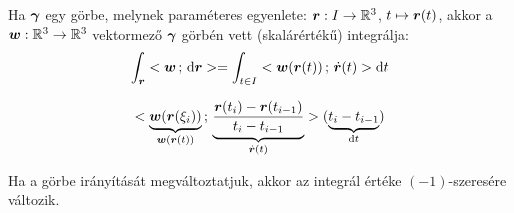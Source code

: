 \documentclass[main.tex]{subfiles}
\begin{document}

Ha $\boldsymbol{\gamma}$ egy görbe, melynek paraméteres egyenlete:
$\boldsymbol{r} : I \rightarrow \mathbb{R}^3$, $t \mapsto \boldsymbol{r}(t)$,
akkor a $\boldsymbol{w}: \mathbb{R}^3 \rightarrow \mathbb{R}^3$ vektormező
$\boldsymbol{\gamma}$ görbén vett (skalárértékű) integrálja:
\begin{equation*}
  \int_{\rvec{r}} \scalar{\rvec{w}}{\differential \rvec{r}}
  = \int_{t \in I} \scalar{
    \rvec{w}(\rvec{r}(t))
  }{\dot{\rvec{r}}(t)} \differential t
\end{equation*}




\begin{equation*}
  \scalar{
    \underbrace{\rvec{w}(\rvec{r}(\xi_i))}_{
      \rvec{w}(\rvec{r}(t))
    }
  }{
    \underbrace{\dfrac{
        \rvec{r}(t_i) - \rvec{r}(t_{i-1})
      }{t_i - t_{i-1}}}_{\dot{\rvec{r}}(t)}
  } (
  \underbrace{t_i - t_{i-1}}_{\differential t}
  )
\end{equation*}




Ha a görbe irányítását megváltoztatjuk,
akkor az integrál értéke $(-1)$-szeresére változik.



\pagebreak
\end{document}
